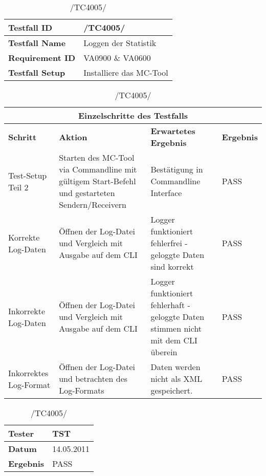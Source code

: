 \begin{table}[h]
    \caption{/TC4005/}
    \label{tab:TC4005}
    \begin{center}
        \begin{tabular}{|p{3.5cm}|p{11cm}|}
            \hline
                \textbf{Testfall ID} & /TC4005/\\
            \hline
                \textbf{Testfall Name} & Loggen der Statistik\\
            \hline
                \textbf{Requirement ID} & VA0900 \& VA0600\\
            \hline
                \textbf{Testfall Setup} &Installiere das MC-Tool\\
            \hline
        \end{tabular}
        \begin{tabular}{|p{2cm}|p{3.9cm}|p{3.9cm}|p{3.8cm}|}
            \multicolumn{4}{|c|}{\textbf{Einzelschritte des Testfalls}} \\
            \hline
                \textbf{Schritt} & \textbf{Aktion} & \textbf{Erwartetes
                Ergebnis} & \textbf{Ergebnis}\\
            \hline
                Test-Setup Teil 2 & Starten des MC-Tool via Commandline mit
                gültigem Start-Befehl und gestarteten Sendern/Receivern &
                Bestätigung in Commandline Interface & PASS\\
            \hline
                Korrekte Log-Daten & Öffnen der Log-Datei und Vergleich mit
                Ausgabe auf dem CLI & Logger funktioniert fehlerfrei -
                geloggte Daten sind korrekt & PASS\\
            \hline
                Inkorrekte Log-Daten & Öffnen der Log-Datei und Vergleich mit
                Ausgabe auf dem CLI & Logger funktioniert fehlerhaft - geloggte
                Daten stimmen nicht mit dem CLI überein & 
                PASS\\
            \hline
                Inkorrektes Log-Format & Öffnen der Log-Datei und betrachten des
                Log-Formats & Daten werden nicht als XML gespeichert. &
                PASS\\
            \hline
        \end{tabular}
        \begin{tabular}{|p{3.5cm}|p{11cm}|}
                \textbf{Tester} & TST\\
            \hline
                \textbf{Datum} & 14.05.2011\\
            \hline
                \textbf{Ergebnis} & PASS\\
            \hline
        \end{tabular}
    \end{center}
\end{table}

